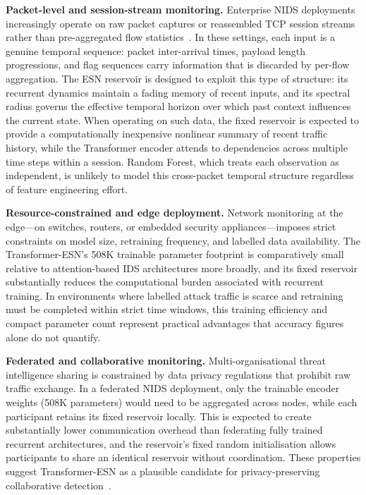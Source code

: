 \documentclass[5p,times]{elsarticle}
\begin{document}
	\textbf{Packet-level and session-stream monitoring.}
	Enterprise NIDS deployments increasingly operate on raw packet captures
	or reassembled TCP session streams rather than pre-aggregated flow
	statistics~\cite{buczak2016survey,khraisat2019survey}. In these
	settings, each input is a genuine temporal sequence: packet inter-arrival
	times, payload length progressions, and flag sequences carry information
	that is discarded by per-flow aggregation. The ESN reservoir is
	designed to exploit this type of structure: its recurrent dynamics
	maintain a fading memory of recent inputs, and its spectral radius
	governs the effective temporal horizon over which past context
	influences the current state. When operating on such data, the fixed
	reservoir is expected to provide a computationally inexpensive nonlinear
	summary of recent traffic history, while the Transformer encoder
	attends to dependencies across multiple time steps within a session.
	Random Forest, which treats each observation as independent, is
	unlikely to model this cross-packet temporal structure regardless of
	feature engineering effort.
	
	\textbf{Resource-constrained and edge deployment.}
	Network monitoring at the edge---on switches, routers, or embedded
	security appliances---imposes strict constraints on model size,
	retraining frequency, and labelled data availability. The
	Transformer-ESN's 508K trainable parameter footprint is comparatively
	small relative to attention-based IDS architectures more broadly, and
	its fixed reservoir substantially reduces the computational burden
	associated with recurrent training. In environments where labelled
	attack traffic is scarce and retraining must be completed within
	strict time windows, this training efficiency and compact parameter
	count represent practical advantages that accuracy figures alone do
	not quantify.
	
	\textbf{Federated and collaborative monitoring.}
	Multi-organisational threat intelligence sharing is constrained by
	data privacy regulations that prohibit raw traffic exchange. In a
	federated NIDS deployment, only the trainable encoder weights (508K
	parameters) would need to be aggregated across nodes, while each
	participant retains its fixed reservoir locally. This is expected to
	create substantially lower communication overhead than federating
	fully trained recurrent architectures, and the reservoir's fixed random
	initialisation allows participants to share an identical reservoir
	without coordination. These properties suggest Transformer-ESN as a
	plausible candidate for privacy-preserving collaborative
	detection~\cite{idrissi2023fedanids,feddef2023}.
	
\end{document}
